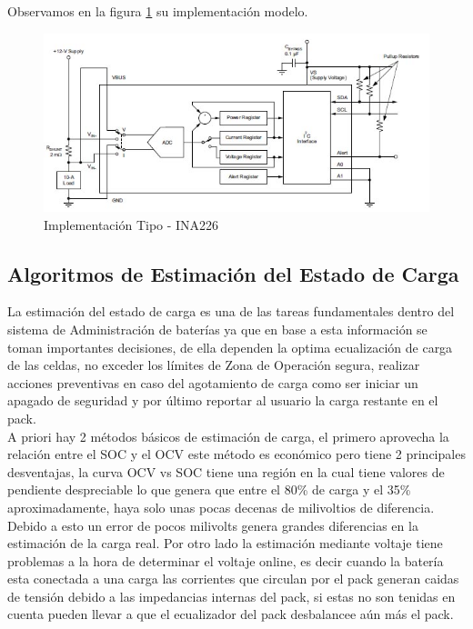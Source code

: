\documentclass[10pt,a4paper]{article}
\begin{document}
\clearpage

Observamos en la figura \ref{fig:ina226-commonimplementation} su implementación modelo. 

\begin{figure}[h!]
	\begin{center}
		\includegraphics[width=0.6\linewidth]{assets/INA226-Common_Implementation}
		\caption{Implementación Tipo - INA226}
		\label{fig:ina226-commonimplementation}
	\end{center}	
\end{figure}




\subsection{Algoritmos de Estimación del Estado de Carga}
La estimación del estado de carga es una de las tareas fundamentales dentro del sistema de Administración de baterías ya que en base a esta información se toman importantes decisiones, de ella dependen la optima ecualización de carga de las celdas, no exceder los límites de Zona de Operación segura, realizar acciones preventivas en caso del agotamiento de carga como ser iniciar un apagado de seguridad y por último reportar al usuario la carga restante en el pack.\\

A priori hay 2 métodos básicos de estimación de carga, el primero aprovecha la relación entre el SOC y el OCV este método es económico pero tiene 2 principales desventajas, la curva OCV vs SOC tiene una región en la cual tiene valores de pendiente despreciable lo que genera que entre el 80\% de carga y el 35\% aproximadamente, haya solo unas pocas decenas de milivoltios de diferencia. Debido a esto un error de pocos milivolts genera grandes diferencias en la estimación de la carga real. Por otro lado la estimación mediante voltaje tiene problemas a la hora de determinar el voltaje online, es decir cuando la batería esta conectada a una carga las corrientes que circulan por el pack generan caidas de tensión debido a las impedancias internas del pack, si estas no son tenidas en cuenta pueden llevar a que el ecualizador del pack desbalancee aún más el pack.\\
\end{document}
